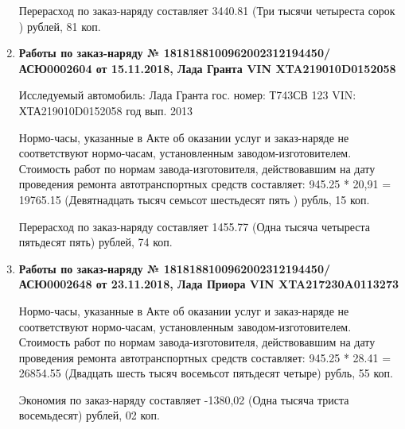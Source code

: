 \begin{enumerate}
Перерасход по заказ-наряду составляет 3440.81 (Три тысячи четыреста сорок ) рублей, 81 коп.  
\vspace{3mm}



\item \par\textbf{{Работы по заказ-наряду    № 1818188100962002312194450/\-АСЮ0002604 от 15.11.2018, Лада Гранта  VIN  XTA219010D0152058
}}

Исследуемый автомобиль:  Лада Гранта гос. номер: Т743СВ 123 VIN: ХТА219010D0152058 год вып. 2013




Нормо-часы, указанные в Акте об оказании услуг и заказ-наряде не соответствуют нормо-часам,  установленным заводом-изготовителем.\\
Стоимость работ по нормам завода-изготовителя, действовавшим на дату проведения ремонта автотранспортных средств составляет: 945.25 * 20,91  = 19765.15 (Девятнадцать тысяч семьсот шестьдесят пять ) рубль, 15 коп.

Перерасход по заказ-наряду составляет 1455.77 (Одна тысяча четыреста пятьдесят пять) рублей, 74 коп.  
\vspace{3mm}










\item \par\textbf{{Работы по заказ-наряду  № 1818188100962002312194450/\-АСЮ0002648 от 23.11.2018, Лада Приора  VIN  XTA217230A0113273
}}



Нормо-часы, указанные в Акте об оказании услуг и заказ-наряде не соответствуют нормо-часам,  установленным заводом-изготовителем.\\
Стоимость работ по нормам завода-изготовителя, действовавшим на дату проведения ремонта автотранспортных средств составляет: 945.25 * 28.41  = 26854.55 (Двадцать шесть тысяч восемьсот пятьдесят четыре) рубль, 55 коп.

Экономия по заказ-наряду составляет -1380,02 (Одна тысяча триста восемьдесят) рублей, 02 коп.  
\vspace{3mm}





\end{enumerate}
